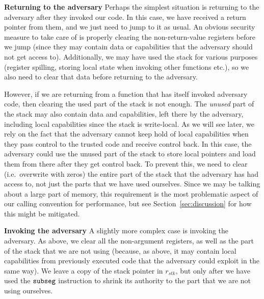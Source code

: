 \documentclass[acmsmall,review]{acmart}\settopmatter{printfolios=true}
\newcommand{\var}[1]{\mathit{#1}}
\newcommand{\stk}{\var{stk}}
\newcommand{\zinstr}[1]{\mathtt{#1}}
\newcommand{\threeinstr}[4]{
  \ifthenelse{\equal{#2#3#4}{}}
  {\zinstr{#1}}
  {\zinstr{#1} \; #2 \; #3 \; #4}
}
\newcommand{\subseg}[3]{\threeinstr{subseg}{#1}{#2}{#3}}
\begin{document}
\textbf{Returning to the adversary} Perhaps the simplest situation is returning
to the adversary after they invoked our code. In this case, we have received a
return pointer from them, and we just need to jump to it as usual. An obvious
security measure to take care of is properly clearing the non-return-value
registers before we jump (since they may contain data or capabilities that the
adversary should not get access to). Additionally, we may have used the stack
for various purposes (register spilling, storing local state when invoking other
functions etc.), so we also need to clear that data before returning to the
adversary.

However, if we are returning from a function that has itself invoked adversary
code, then clearing the used part of the stack is not enough. The \emph{unused}
part of the stack may also contain data and capabilities, left there by the
adversary, including local capabilities since the stack is write-local. As we
will see later, we rely on the fact that the adversary cannot keep hold of local
capabilities when they pass control to the trusted code and receive control
back. In this case, the adversary could use the unused part of the stack to
store local pointers and load them from there after they get control back. To
prevent this, we need to clear (i.e.\ overwrite with zeros) the entire part of
the stack that the adversary has had access to, not just the parts that we have
used ourselves. Since we may be talking about a large part of memory, this
requirement is the most problematic aspect of our calling convention for
performance, but see Section~\ref{sec:discussion} for how this might be
mitigated.

\textbf{Invoking the adversary} A slightly more complex case is invoking the
adversary. As above, we clear all the non-argument registers, as well as the
part of the stack that we are not using (because, as above, it may contain local
capabilities from previously executed code that the adversary could exploit in
the same way). We leave a copy of the stack pointer in $r_\stk$, but only after
we have used the $\subseg{}{}{}$ instruction to shrink its authority to the part
that we are not using ourselves.
\end{document}
